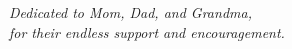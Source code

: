 \begin{center}
    \textit{Dedicated to Mom, Dad, and Grandma, \\for their endless support and encouragement.}
\end{center}